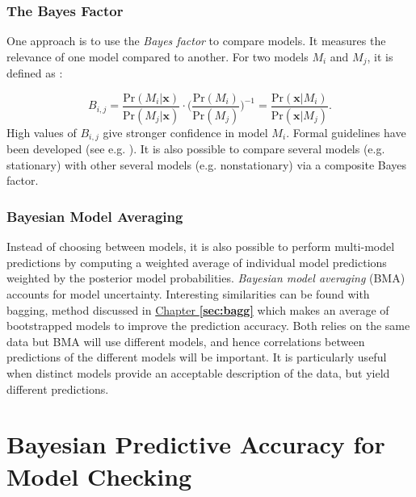 \subsubsection*{The Bayes Factor}

One approach is to use the \emph{Bayes factor}
to compare models. It measures the relevance of one model compared to another. For two models $M_i$ and $M_j$, it is defined as : 

\begin{equation}
B_{i,j}=\frac{\text{Pr}(M_i|\boldsymbol{x})}{\text{Pr}(M_j|\boldsymbol{x})}\cdot \Bigg(\frac{\text{Pr}(M_i)}{\text{Pr}(M_j)}\Bigg)^{-1}= \frac{\text{Pr}(\boldsymbol{x}|M_i)}{\text{Pr}(\boldsymbol{x}|M_j)}.
\end{equation}
High values of $B_{i,j}$ give stronger confidence in model $M_i$. Formal guidelines have been developed (see e.g. \citet{robert_1995}). It is also possible to compare several models (e.g. stationary) with other several models (e.g. nonstationary) via a composite Bayes factor.


\subsubsection*{Bayesian Model Averaging}

Instead of choosing between models, it is also possible to perform multi-model predictions by computing a weighted average of individual model predictions weighted by the posterior model probabilities. 
\emph{Bayesian model averaging} (BMA) accounts for model uncertainty. Interesting similarities can be found with bagging, method discussed in \hyperref[sec:bagg]{Chapter \textbf{\ref{sec:bagg}}} which makes an average of bootstrapped models to improve the prediction accuracy. Both relies on the same data but BMA will use different models, and hence correlations between predictions of the different models will be important. It is particularly useful when distinct models provide an acceptable description of the data, but yield different predictions.



\section{Bayesian Predictive Accuracy for Model Checking}\label{sec:predacur}



